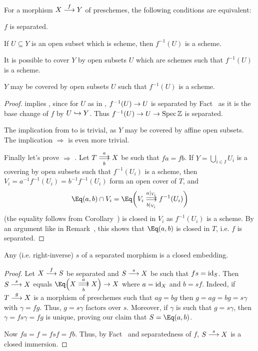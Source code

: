 \documentclass[a4paper,parskip=half,numbers=enddot, DIV=12]{scrreprt}
\begin{document}
\begin{fact}
    For a morphism $X\morphism[f] Y$ of preschemes, the following conditions are equivalent:
    \begin{alphanumerate}
    \item 
        $f$ is separated.
    \item 
        If $U\subseteq Y$ is an open subset which is scheme, then $f^{-1}(U)$ is a scheme.
    \item 
        It is possible to cover $Y$ by open subsets $U$ which are schemes such that $f^{-1}(U)$ is a scheme.
     \item
	     $Y$ may be covered by open subsets $U$ such that $f^{-1}(U)$ is a scheme.
    \end{alphanumerate}
\end{fact}
\begin{proof}
     implies , since for $U$ as in , $f^{-1}(U)\morphism U$ is separated by Fact~ as it is the base change of $f$ by $U\monomorphism Y$. Thus $f^{-1}(U)\morphism U\morphism \Spec\IZ$ is separated.
    
    The implication from  to  is trivial, as $Y$ may be covered by affine open subsets. The implication  $\Rightarrow$  is even more trivial.
    
    Finally let's prove  $\Rightarrow$ . Let $T\doublemorphism[a][b] X$ be such that $fa = fb$. If $Y=\bigcup_{i\in I} U_i$ is a covering by open subsets such that $f^{-1}(U_i)$ is a scheme, then $V_i = a^{-1}f^{-1}(U_i) = b^{-1}f^{-1} (U_i)$ form an open cover of $T$, and 
    \begin{align*}
    	\Eq(a,b) \cap V_i = \Eq\bigg(V_i\doublemorphism[a|_{V_i}][b|_{V_i}]f^{-1}(U_i) \bigg)
    \end{align*}
    (the equality follows from Corollary~) is closed in $V_i$ as $f^{-1}(U_i) $ is a scheme. By an argument like in Remark~, this shows that $\Eq(a,b)$ is closed in $T$, i.e. $f$ is separated.
\end{proof}
\begin{prop}
    Any  (i.e. right-inverse) $s$ of a separated morphism is a closed embedding. 
\end{prop}
\begin{proof}
    Let $X\morphism[f] S$ be separated and $S\morphism[s] X$ be such that $fs = \operatorname{id}_S$. Then $S\morphism[s] X$ equals $\Eq\Big(X\doublemorphism[a][b] X\Big)\morphism X$ where $a=\operatorname{id}_X$ and $b= sf$. Indeed, if $T\morphism[g] X$ is a morphism of preschemes such that $ag = bg$ then $g = ag = bg = s\gamma$ with $\gamma = fg$. Thus, $g = s\gamma$ factors over $s$. Moreover, if $\gamma$ is such that $g= s\gamma$, then $\gamma = fs\gamma = fg$ is unique, proving our claim that $S=\Eq(a,b)$.
    
     Now $fa = f = fsf = fb$. Thus, by Fact~ and separatedness of $f$, $S\morphism[s] X$ is a closed immersion.
\end{proof}
\end{document}
